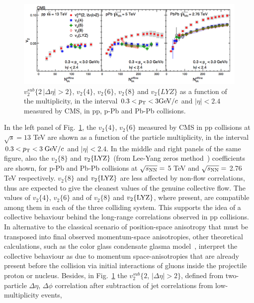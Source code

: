\begin{figure}[!ht]
  \centering
  \includegraphics[width=15cm]{FigCap1/v2CumulantsCMS.png}
  \caption{$v_2^{sub} \{2\, |\Delta \eta| > 2\}$, $v_2 \{4\}$, $v_2 \{6\}$, $v_2 \{8\}$ 
  and $v_2 \{LYZ\}$ as a function of the multiplicity, 
  in the interval $0.3 < p_{\rm T} < 3 \mathrm{GeV}/c$ and $|\eta| < 2.4$~\cite{Khachatryan:2016txc} measured by CMS, in pp, p-Pb and Pb-Pb collisions.}
  \label{fig:CumulantsCMS}
\end{figure}
In the left panel of Fig.~\ref{fig:CumulantsCMS}, the $v_2 \{4\}$, $v_2 \{6\}$
measured by CMS in pp collisions at $\sqrt{s} = 13$ TeV are shown as a 
function of the particle multiplicity, in the interval $0.3 < p_{\rm T} < 3 \; \mathrm{GeV}/c$ and 
$|\eta| < 2.4$. In the middle and right panels of the same figure, also the $v_2 \{8\}$ and $v_2 \{ {\rm LYZ} \}$ 
(from Lee-Yang zeros method~\cite{Bhalerao:2003yq}) coefficients are shown, for p-Pb and Pb-Pb collisions
at $\sqrt{s_{\rm NN}} = $ 5 TeV and $\sqrt{s_{\rm NN}} = $ 2.76 TeV respectively.
$v_2 \{8\}$ and $v_2 \{ {\rm LYZ} \}$ are less affected by non-flow correlations, 
thus are expected to give the 
cleanest values of the genuine collective flow.
The values of $v_2 \{4\}$, $v_2 \{6\}$ and of $v_2 \{8\}$ and  $v_2 \{ {\rm LYZ} \}$, where present, are compatible among 
them in each of the three colliding system. This supports the idea 
of a collective behaviour behind the long-range correlations observed in pp 
collisions. In alternative to the classical scenario of position-space
anisotropy that must be transposed into final observed momentum-space anisotropies, other theoretical 
calculations, such as the color glass condensate glasma model~\cite{Schenke:2016ksl}, 
interpret the collective behaviour as due to momentum space-anisotropies that are
already present before the collision via initial interactions of gluons inside the projectile proton or
nucleus. Besides, in Fig.~\ref{fig:CumulantsCMS} the 
$v_2^{sub} \{2$, $|\Delta \eta| > 2\}$, defined from two-particle 
$\Delta \eta$, $\Delta \phi$ correlation after subtraction of jet correlations from low-multiplicity events, 
